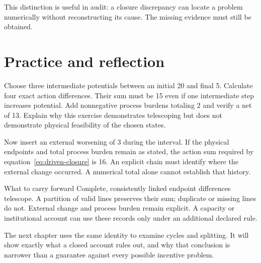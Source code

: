 This distinction is useful in audit: a closure discrepancy can locate a problem numerically without reconstructing its cause. The missing evidence must still be obtained.

\section{Practice and reflection}
Choose three intermediate potentials between an initial 20 and final 5. Calculate four exact action differences. Their sum must be 15 even if one intermediate step increases potential. Add nonnegative process burdens totaling 2 and verify a net of 13. Explain why this exercise demonstrates telescoping but does not demonstrate physical feasibility of the chosen states.

Now insert an external worsening of 3 during the interval. If the physical endpoints and total process burden remain as stated, the action sum required by equation~\eqref{eq:driven-closure} is 16. An explicit chain must identify where the external change occurred. A numerical total alone cannot establish that history.

\begin{intuitionbox}{What to carry forward}
Complete, consistently linked endpoint differences telescope. A partition of valid lines preserves their sum; duplicate or missing lines do not. External change and process burden remain explicit. A capacity or institutional account can use these records only under an additional declared rule.
\end{intuitionbox}

The next chapter uses the same identity to examine cycles and splitting. It will show exactly what a closed account rules out, and why that conclusion is narrower than a guarantee against every possible incentive problem.
